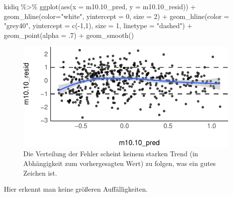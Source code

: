 \documentclass[
  a4paper,
  DIV=11]{scrreprt}
\newenvironment{Shaded}{\begin{snugshade}}{\end{snugshade}}
\newcommand{\AttributeTok}[1]{\textcolor[rgb]{0.40,0.45,0.13}{#1}}
\newcommand{\DecValTok}[1]{\textcolor[rgb]{0.68,0.00,0.00}{#1}}
\newcommand{\FloatTok}[1]{\textcolor[rgb]{0.68,0.00,0.00}{#1}}
\newcommand{\FunctionTok}[1]{\textcolor[rgb]{0.28,0.35,0.67}{#1}}
\newcommand{\NormalTok}[1]{\textcolor[rgb]{0.00,0.23,0.31}{#1}}
\newcommand{\SpecialCharTok}[1]{\textcolor[rgb]{0.37,0.37,0.37}{#1}}
\newcommand{\StringTok}[1]{\textcolor[rgb]{0.13,0.47,0.30}{#1}}
\theoremstyle{definition}
\theoremstyle{remark}
\begin{document}
\begin{Shaded}
\begin{Highlighting}[]
\NormalTok{kidiq }\SpecialCharTok{\%\textgreater{}\%} 
  \FunctionTok{ggplot}\NormalTok{(}\FunctionTok{aes}\NormalTok{(}\AttributeTok{x =}\NormalTok{ m10}\FloatTok{.10}\NormalTok{\_pred, }\AttributeTok{y =}\NormalTok{ m10}\FloatTok{.10}\NormalTok{\_resid)) }\SpecialCharTok{+}
  \FunctionTok{geom\_hline}\NormalTok{(}\AttributeTok{color=}\StringTok{"white"}\NormalTok{, }\AttributeTok{yintercept =} \DecValTok{0}\NormalTok{, }\AttributeTok{size =} \DecValTok{2}\NormalTok{) }\SpecialCharTok{+}
  \FunctionTok{geom\_hline}\NormalTok{(}\AttributeTok{color =} \StringTok{"grey40"}\NormalTok{, }
             \AttributeTok{yintercept =} \FunctionTok{c}\NormalTok{(}\SpecialCharTok{{-}}\DecValTok{1}\NormalTok{,}\DecValTok{1}\NormalTok{), }
             \AttributeTok{size =} \DecValTok{1}\NormalTok{, }
             \AttributeTok{linetype =} \StringTok{"dashed"}\NormalTok{) }\SpecialCharTok{+}
  \FunctionTok{geom\_point}\NormalTok{(}\AttributeTok{alpha =}\NormalTok{ .}\DecValTok{7}\NormalTok{) }\SpecialCharTok{+}
  \FunctionTok{geom\_smooth}\NormalTok{()}
\end{Highlighting}
\end{Shaded}

\begin{figure}[H]

{\centering \includegraphics{./metrische-AV_files/figure-pdf/fig-kidiqresiduum-1.pdf}

}

\caption{\label{fig-kidiqresiduum}Die Verteilung der Fehler scheint
keinem starken Trend (in Abhängigkeit zum vorhergesagten Wert) zu
folgen, was ein gutes Zeichen ist.}

\end{figure}

Hier erkennt man keine größeren Auffälligkeiten.
\end{document}
